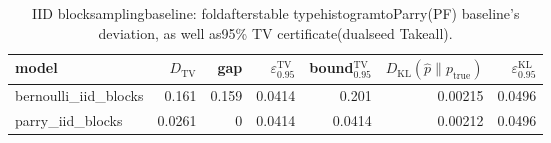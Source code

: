 \begin{table}[H]
\centering
\scriptsize
\setlength{\tabcolsep}{4pt}
\caption{IID blocksamplingbaseline: foldafterstable typehistogramtoParry(PF) baseline's deviation, as well as95\% TV certificate(dualseed Takeall).}
\label{tab:iid_sources_fold_vs_parry_ci}
\begin{tabular}{lrrrrrr}
\toprule
model & $D_\mathrm{TV}$ & gap & $\varepsilon^{\mathrm{TV}}_{0.95}$ & bound$^{\mathrm{TV}}_{0.95}$ & $D_\mathrm{KL}(\hat p\|p_{\mathrm{true}})$ & $\varepsilon^{\mathrm{KL}}_{0.95}$\\
\midrule
bernoulli\_iid\_blocks & 0.161 & 0.159 & 0.0414 & 0.201 & 0.00215 & 0.0496\\
parry\_iid\_blocks & 0.0261 & 0 & 0.0414 & 0.0414 & 0.00212 & 0.0496\\
\bottomrule
\end{tabular}
\end{table}
